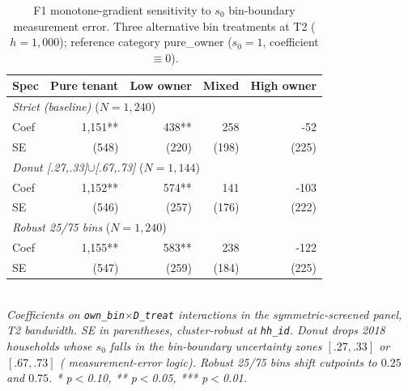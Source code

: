 \begin{table}[t]
\centering
\caption{F1 monotone-gradient sensitivity to $s_0$ bin-boundary measurement error. Three alternative bin treatments at T2 ($h = 1{,}000$); reference category pure\_owner ($s_0 = 1$, coefficient $\equiv 0$).}
\label{tab:fuzzy_bin_sensitivity_en}
\begin{tabular}{lrrrr}
\toprule
Spec & Pure tenant & Low owner & Mixed & High owner \\
\midrule
\multicolumn{5}{l}{\textit{Strict (baseline)} ($N = 1,240$)} \\
Coef & 1,151** & 438** & 258 & -52 \\
SE & (548) & (220) & (198) & (225) \\
\multicolumn{5}{l}{\textit{Donut [.27,.33]$\cup$[.67,.73]} ($N = 1,144$)} \\
Coef & 1,152** & 574** & 141 & -103 \\
SE & (546) & (257) & (176) & (222) \\
\multicolumn{5}{l}{\textit{Robust 25/75 bins} ($N = 1,240$)} \\
Coef & 1,155** & 583** & 238 & -122 \\
SE & (547) & (259) & (184) & (225) \\
\bottomrule
\end{tabular}
\\
\footnotesize\textit{Coefficients on \texttt{own\_bin}$\times$\texttt{D\_treat} interactions in the symmetric-screened panel, T2 bandwidth. SE in parentheses, cluster-robust at \texttt{hh\_id}. Donut drops 2018 households whose $s_0$ falls in the bin-boundary uncertainty zones $[.27, .33]$ or $[.67, .73]$ (\citealp{Roth2022_pretrends} measurement-error logic). Robust 25/75 bins shift cutpoints to $0.25$ and $0.75$. * p$<$0.10, ** p$<$0.05, *** p$<$0.01.}
\end{table}
